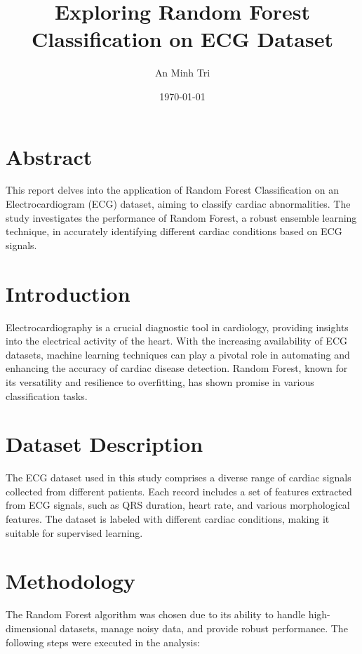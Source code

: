 \documentclass[a4paper, 12pt]{article}
\title{Exploring Random Forest Classification on ECG Dataset}
\author{An Minh Tri}
\date{\today}
\begin{document}
\maketitle

\section*{Abstract}
This report delves into the application of Random Forest Classification on an Electrocardiogram (ECG) dataset, aiming to classify cardiac abnormalities. The study investigates the performance of Random Forest, a robust ensemble learning technique, in accurately identifying different cardiac conditions based on ECG signals.

\section{Introduction}
Electrocardiography is a crucial diagnostic tool in cardiology, providing insights into the electrical activity of the heart. With the increasing availability of ECG datasets, machine learning techniques can play a pivotal role in automating and enhancing the accuracy of cardiac disease detection. Random Forest, known for its versatility and resilience to overfitting, has shown promise in various classification tasks.

\section{Dataset Description}
The ECG dataset used in this study comprises a diverse range of cardiac signals collected from different patients. Each record includes a set of features extracted from ECG signals, such as QRS duration, heart rate, and various morphological features. The dataset is labeled with different cardiac conditions, making it suitable for supervised learning.

\section{Methodology}
The Random Forest algorithm was chosen due to its ability to handle high-dimensional datasets, manage noisy data, and provide robust performance. The following steps were executed in the analysis:
\end{document}
